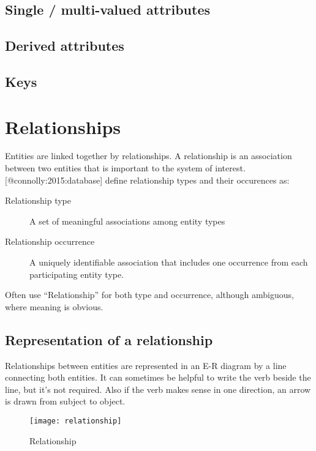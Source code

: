 \subsection{Single / multi-valued attributes}
\label{single-multi-valued-attributes}

\subsection{Derived attributes}\label{derived-attributes}

\subsection{Keys}\label{keys}

\section{Relationships}\label{relationships}

Entities are linked together by relationships. A relationship is an
association between two entities that is important to the system of
interest. {[}@connolly:2015:database{]} define relationship types and
their occurences as:

\begin{description}
\item[Relationship type]
A set of meaningful associations among entity types
\item[Relationship occurrence]
A uniquely identifiable association that includes one occurrence from
each participating entity type.
\end{description}

Often use ``Relationship'' for both type and occurrence, although
ambiguous, where meaning is obvious.

\subsection{Representation of a
relationship}\label{representation-of-a-relationship}

Relationships between entities are represented in an E-R diagram by a
line connecting both entities. It can sometimes be helpful to write the
verb beside the line, but it's not required. Also if the verb makes
sense in one direction, an arrow is drawn from subject to object.

\begin{figure}[htbp]
\centering
\texttt{[image: relationship]}
\caption{Relationship}
\end{figure}

